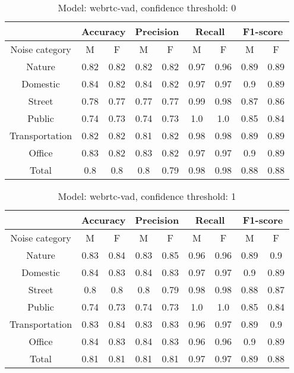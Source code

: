 \documentclass[../main.tex]{subfiles}
\begin{document}
    \begin{table}[H]
    \centering
    \small
    \begin{tabular}{ |c|c|c|c|c|c|c|c|c| }
    \hline
     &\multicolumn{2}{|c|}{Accuracy}&\multicolumn{2}{|c|}{Precision}&\multicolumn{2}{|c|}{Recall}&\multicolumn{2}{|c|}{F1-score} \\ 
    \hline
    Noise category & M & F & M & F & M & F & M & F \\ 
    \hline
    Nature & 0.82 & 0.82 & 0.82 & 0.82 & 0.97 & 0.96 & 0.89 & 0.89 \\ 
    Domestic & 0.84 & 0.82 & 0.84 & 0.82 & 0.97 & 0.97 & 0.9 & 0.89 \\ 
    Street & 0.78 & 0.77 & 0.77 & 0.77 & 0.99 & 0.98 & 0.87 & 0.86 \\ 
    Public & 0.74 & 0.73 & 0.74 & 0.73 & 1.0 & 1.0 & 0.85 & 0.84 \\ 
    Transportation & 0.82 & 0.82 & 0.81 & 0.82 & 0.98 & 0.98 & 0.89 & 0.89 \\ 
    Office & 0.83 & 0.82 & 0.83 & 0.82 & 0.97 & 0.97 & 0.9 & 0.89 \\ 
    Total & 0.8 & 0.8 & 0.8 & 0.79 & 0.98 & 0.98 & 0.88 & 0.88 \\ 
    \hline
    \end{tabular}
    \caption{Model: webrtc-vad, confidence threshold: 0}
    \end{table}
    
    \begin{table}[H]
    \centering
    \small
    \begin{tabular}{ |c|c|c|c|c|c|c|c|c| }
    \hline
     &\multicolumn{2}{|c|}{Accuracy}&\multicolumn{2}{|c|}{Precision}&\multicolumn{2}{|c|}{Recall}&\multicolumn{2}{|c|}{F1-score} \\ 
    \hline
    Noise category & M & F & M & F & M & F & M & F \\ 
    \hline
    Nature & 0.83 & 0.84 & 0.83 & 0.85 & 0.96 & 0.96 & 0.89 & 0.9 \\ 
    Domestic & 0.84 & 0.83 & 0.84 & 0.83 & 0.97 & 0.97 & 0.9 & 0.89 \\ 
    Street & 0.8 & 0.8 & 0.8 & 0.79 & 0.98 & 0.98 & 0.88 & 0.87 \\ 
    Public & 0.74 & 0.73 & 0.74 & 0.73 & 1.0 & 1.0 & 0.85 & 0.84 \\ 
    Transportation & 0.83 & 0.84 & 0.83 & 0.83 & 0.96 & 0.97 & 0.89 & 0.9 \\ 
    Office & 0.84 & 0.83 & 0.84 & 0.83 & 0.96 & 0.96 & 0.9 & 0.89 \\ 
    Total & 0.81 & 0.81 & 0.81 & 0.81 & 0.97 & 0.97 & 0.89 & 0.88 \\ 
    \hline
    \end{tabular}
    \caption{Model: webrtc-vad, confidence threshold: 1}
    \end{table}
    
\end{document}
